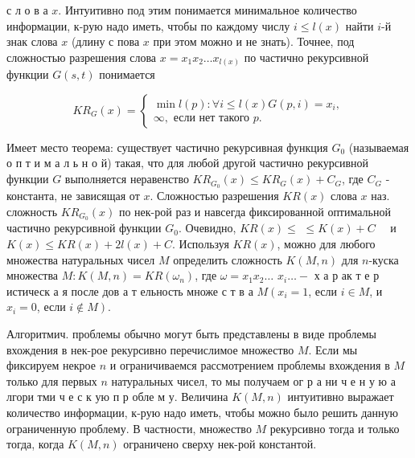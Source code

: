 \documentclass[10pt]{article}
\begin{document}
с л о в а $x$. Интуитивно под этим понимается минимальное количество информации, к-рую надо иметь, чтобы по каждому числу $i \leqslant l(x)$ найти $i$-й знак слова $x$ (длину с пова $x$ при этом можно и не знать). Точнее, под сложностью разрешения слова $x=x_{1} x_{2} \ldots x_{l(x)}$ по частично рекурсивной функции $G(s, t)$ понимается



\[

K R_{G}(x)=\left\{\begin{array}{c}

\min l(p): \forall i \leqslant l(x) G(p, i)=x_{i}, \\

\infty, \text { если нет такого } p .

\end{array}\right.

\]



Имеет место теорема: существует частично рекурсивная функция $G_{0}$ (называемая о п т и м а л ь н о й) такая, что для любой другой частично рекурсивной функции $G$ выполняется неравенство $K R_{G_{0}}(x) \leqslant K R_{G}(x)+C_{G}$, где $C_{G}$ - константа, не зависящая от $x$. Сложностью разрешения $K R(x)$ слова $x$ наз. сложность $K R_{G_{0}}(x)$ по нек-рой раз и навсегда фиксированной оптимальной частично рекурсивной функции $G_{0}$. Очевидно, $K R(x) \leqslant$ $\leqslant K(x)+C \quad$ и $K(x) \leqslant K R(x)+2 l(x)+C$. Используя $K R(x)$, можно для любого множества натуральных чисел $M$ определить сложность $K(M, n)$ для $n$-куска множества $M: K(M, n)=K R\left(\omega_{n}\right)$, где $\omega=x_{1} x_{2} \ldots$ $x_{i} \ldots-$ х а р ак т е р истическ а я после дов а т ельность множе с т в а $M\left(x_{i}=1\right.$, если $i \in M$, и $x_{i}=0$, если $\left.i \notin M\right)$.



Алгоритмич. проблемы обычно могут быть представлены в виде проблемы вхождения в нек-рое рекурсивно перечислимое множество $M$. Если мы фиксируем некрое $n$ и ограничиваемся рассмотрением проблемы вхождения в $M$ только для первых $n$ натуральных чисел, то мы получаем ог р а ни ч е н у ю а лгори тми ч е с к ую п р обле м у. Величина $K(M, n)$ интуитивно выражает количество информации, к-рую надо иметь, чтобы можно было решить данную ограниченную проблему. В частности, множество $M$ рекурсивно тогда и только тогда, когда $K(M, n)$ ограничено сверху нек-рой константой.
\end{document}
